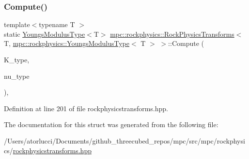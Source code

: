 \subsubsection{\texorpdfstring{Compute()}{Compute()}\hspace{0.1cm}{\footnotesize\ttfamily [6/6]}}
{\footnotesize\ttfamily template$<$typename T $>$ \\
static \mbox{\hyperlink{structmpc_1_1rockphysics_1_1_youngs_modulus_type}{Youngs\+Modulus\+Type}}$<$T$>$ \mbox{\hyperlink{structmpc_1_1rockphysics_1_1_rock_physics_transforms}{mpc\+::rockphysics\+::\+Rock\+Physics\+Transforms}}$<$ T, \mbox{\hyperlink{structmpc_1_1rockphysics_1_1_youngs_modulus_type}{mpc\+::rockphysics\+::\+Youngs\+Modulus\+Type}}$<$ T $>$ $>$\+::Compute (\begin{DoxyParamCaption}\item[{const \mbox{\hyperlink{structmpc_1_1rockphysics_1_1_bulk_modulus_type}{mpc\+::rockphysics\+::\+Bulk\+Modulus\+Type}}$<$ T $>$ \&}]{K\+\_\+type,  }\item[{const \mbox{\hyperlink{structmpc_1_1rockphysics_1_1_poissons_ratio_type}{mpc\+::rockphysics\+::\+Poissons\+Ratio\+Type}}$<$ T $>$ \&}]{nu\+\_\+type }\end{DoxyParamCaption})\hspace{0.3cm}{\ttfamily [inline]}, {\ttfamily [static]}}



Definition at line 201 of file rockphysicstransforms.\+hpp.



The documentation for this struct was generated from the following file\+:\begin{DoxyCompactItemize}
\item 
/\+Users/atorlucci/\+Documents/github\+\_\+threecubed\+\_\+repos/mpc/src/mpc/rockphysics/\mbox{\hyperlink{rockphysicstransforms_8hpp}{rockphysicstransforms.\+hpp}}\end{DoxyCompactItemize}
